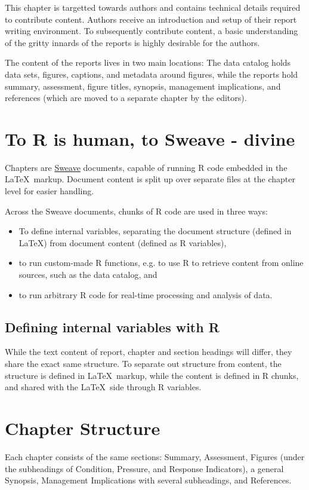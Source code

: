 This chapter is targetted towards authors and contains technical details required to contribute content.
Authors receive an introduction and setup of their report writing environment.
To subsequently contribute content, a basic understanding of the gritty innards
of the reports is highly desirable for the authors.

The content of the reports lives in two main locations:
The data catalog holds data sets, figures, captions, and metadata around figures,
while the reports hold summary, assessment, figure titles, synopsis, management
implications, and references (which are moved to a separate chapter by the editors).

\section*{To R is human, to Sweave - divine}
Chapters are \href{http://www.stat.uni-muenchen.de/~leisch/Sweave/}{Sweave} documents,
capable of running R code embedded in the \LaTeX\ markup.
Document content is split up over separate files at the chapter level for easier handling.

Across the Sweave documents, chunks of R code are used in three ways:
\begin{itemize}
\item To define internal variables, separating the document structure
	(defined in \LaTeX) from document content (defined as R variables),
\item to run custom-made R functions, e.g. to use R to retrieve content from online
	sources, such as the data catalog, and
\item to run arbitrary R code for real-time processing and analysis of data.
\end{itemize}

\subsection*{Defining internal variables with R}
While the text content of report, chapter and section headings will differ,
they share the exact same structure. To separate out structure from content, the
structure is defined in \LaTeX\ markup, while the content is defined
in R chunks, and shared with the \LaTeX\ side through R variables.

\section*{Chapter Structure}
Each chapter consists of the same sections: Summary, Assessment, Figures
(under the subheadings of Condition, Pressure, and Response Indicators),
a general Synopsis, Management Implications with several subheadings,
and References.

